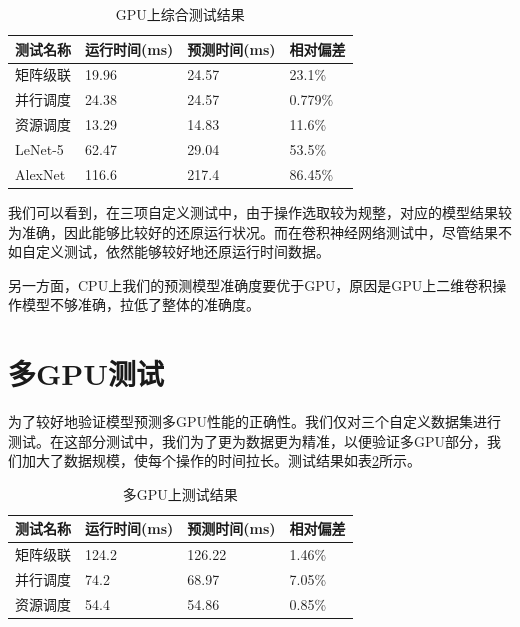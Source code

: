     \begin{table}[!htbp]
        \centering
	    \caption{GPU上综合测试结果}
        \label{tab:pre_gpu}
        \begin{tabular}{|l|l|l|l|}
            \hline
            测试名称 & 运行时间(ms) & 预测时间(ms) & 相对偏差\\
            \hline
            矩阵级联 & 19.96 & 24.57 & 23.1\% \\
            \hline
            并行调度 & 24.38 & 24.57 & 0.779\% \\
            \hline
            资源调度 & 13.29 & 14.83 & 11.6\% \\
            \hline
            LeNet-5 & 62.47 & 29.04 & 53.5\% \\
            \hline
            AlexNet & 116.6 & 217.4 & 86.45\% \\
            \hline
        \end{tabular}
    \end{table}
    
    我们可以看到，在三项自定义测试中，由于操作选取较为规整，对应的模型结果较为准确，因此能够比较好的还原运行状况。而在卷积神经网络测试中，尽管结果不如自定义测试，依然能够较好地还原运行时间数据。
    
    另一方面，CPU上我们的预测模型准确度要优于GPU，原因是GPU上二维卷积操作模型不够准确，拉低了整体的准确度。

\section{多GPU测试}
    为了较好地验证模型预测多GPU性能的正确性。我们仅对三个自定义数据集进行测试。在这部分测试中，我们为了更为数据更为精准，以便验证多GPU部分，我们加大了数据规模，使每个操作的时间拉长。测试结果如表\ref{tab:mul_gpu}所示。
    
    \begin{table}[!htbp]
        \centering
	    \caption{多GPU上测试结果}
        \label{tab:mul_gpu}
        \begin{tabular}{|l|l|l|l|}
            \hline
            测试名称 & 运行时间(ms) & 预测时间(ms) & 相对偏差\\
            \hline
            矩阵级联 & 124.2 & 126.22 & 1.46\% \\
            \hline
            并行调度 & 74.2 & 68.97 & 7.05\% \\
            \hline
            资源调度 & 54.4 & 54.86 & 0.85\% \\
            \hline
        \end{tabular}
    \end{table}
    
